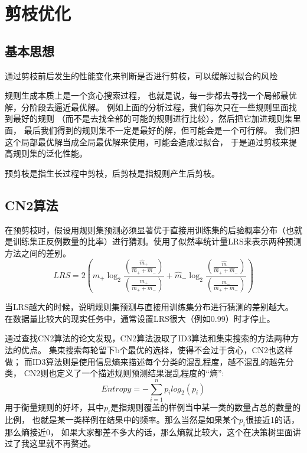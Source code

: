 \documentclass[UTF8]{article}
\begin{document}
\section{剪枝优化}
\subsection{基本思想}
    通过剪枝前后发生的性能变化来判断是否进行剪枝，可以缓解过拟合的风险
    
    规则生成本质上是一个贪心搜索过程，
    也就是说，每一步都去寻找一个局部最优解，分阶段去逼近最优解。
    例如上面的分析过程，我们每次只在一些规则里面找到最好的规则
    （而不是去找全部的可能的规则进行比较），然后把它加进规则集里面，
    最后我们得到的规则集不一定是最好的解，但可能会是一个可行解。
    我们把这个局部最优解当成全局最优解来使用，可能会造成过拟合，
    于是通过剪枝来提高规则集的泛化性能。

    预剪枝是指生长过程中剪枝，后剪枝是指规则产生后剪枝。
\subsection{CN2算法}
    在预剪枝时，假设用规则集预测必须显著优于直接用训练集的后验概率分布（也就是训练集正反例数量的比率）进行猜测。使用了似然率统计量LRS来表示两种预测方法之间的差别。
    \begin{equation}
        LRS = 2(\hat{m}_+ \log_2{\frac{(\frac{\hat{m}_+}{\hat{m}_+ + \hat{m}_-})}{(\frac{m_+}{m_+ + m_-})}} + 
        \hat{m}_- \log_2{\frac{(\frac{\hat{m}_-}{\hat{m}_+ + \hat{m}_-})}{(\frac{m_-}{m_+ + m_-})}})
    \end{equation}

    当LRS越大的时候，说明规则集预测与直接用训练集分布进行猜测的差别越大。
    在数据量比较大的现实任务中，通常设置LRS很大（例如0.99）时才停止。
    
    通过查找CN2算法的论文发现，CN2算法汲取了ID3算法和集束搜索的方法两种方法的优点。
    集束搜索每轮留下b个最优的选择，使得不会过于贪心，CN2也这样做；
    而ID3算法则是使用信息熵来描述每个分类的混乱程度，越不混乱的越先分类，
    CN2则也定义了一个描述规则预测结果混乱程度的“熵”:
    \begin{equation}
        Entropy = -\sum_{i=1}^n p_i log_2(p_i)
    \end{equation}
    用于衡量规则的好坏，其中$p_i$是指规则覆盖的样例当中某一类的数量占总的数量的比例，
    也就是某一类样例在结果中的频率。那么当然是如果某个$p_i$很接近1的话，那么熵接近0，
    如果大家都差不多大的话，那么熵就比较大，这个在决策树里面讲过了我这里就不再赘述。
    
\end{document}
